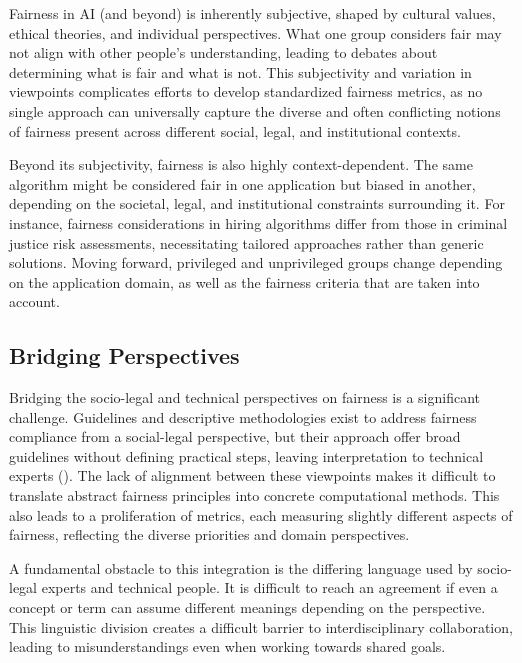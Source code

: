\documentclass[12pt,a4paper,openright,twoside]{book}
\begin{document}

Fairness in \ac{AI} (and beyond) is inherently subjective, shaped by cultural values, ethical theories, and individual perspectives.
%
What one group considers fair may not align with other people’s understanding, leading to debates about determining what is fair and what is not.
%
This subjectivity and variation in viewpoints complicates efforts to develop standardized fairness metrics, as no single approach can universally capture the diverse and often conflicting notions of fairness present across different social, legal, and institutional contexts.


Beyond its subjectivity, fairness is also highly context-dependent. The same algorithm might be considered fair in one application but biased in another, depending on the societal, legal, and institutional constraints surrounding it.
%
For instance, fairness considerations in hiring algorithms differ from those in criminal justice risk assessments, necessitating tailored approaches rather than generic solutions.
%
Moving forward, privileged and unprivileged groups change depending on the application domain, as well as the fairness criteria that are taken into account.

\subsection{Bridging Perspectives}

Bridging the socio-legal and technical perspectives on fairness is a significant challenge. 
%
Guidelines and descriptive methodologies exist to address fairness compliance from a social-legal perspective, but their approach offer broad guidelines without defining practical steps, leaving interpretation to technical experts (\cite{hicssfairness2025}).
%
The lack of alignment between these viewpoints makes it difficult to translate abstract fairness principles into concrete computational methods.
%
This also leads to a proliferation of metrics, each measuring slightly different aspects of fairness, reflecting the diverse priorities and domain perspectives.


A fundamental obstacle to this integration is the differing language used by socio-legal experts and technical people.
%
It is difficult to reach an agreement if even a concept or term can assume different meanings depending on the perspective.
This linguistic division creates a difficult barrier to interdisciplinary collaboration, leading to misunderstandings even when working towards shared goals.
\end{document}

